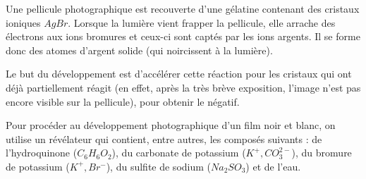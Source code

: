 \documentclass[10pt,a4paper]{article}
\begin{document}
Une pellicule photographique est recouverte d'une gélatine contenant des cristaux ioniques $AgBr$. Lorsque la lumière vient frapper la pellicule, elle arrache
des électrons aux ions bromures et ceux-ci sont captés par les ions argents. Il se forme donc des atomes d'argent solide (qui noircissent à la lumière).

Le but du développement est d'accélérer cette réaction pour les cristaux qui ont déjà partiellement réagit (en effet, après la très brève exposition, 
l'image n'est pas encore visible sur la pellicule), pour obtenir le négatif.

Pour procéder au développement photographique d'un film noir et blanc, on utilise un révélateur qui contient, entre autres, les composés suivants : de 
l'hydroquinone ($C_6H_6O_2$), du carbonate de potassium ($K^+,CO_3^{2-}$), du bromure de potassium ($K^+,Br^-$), du sulfite de sodium ($Na_2SO_3$) et de l'eau.
\end{document}
